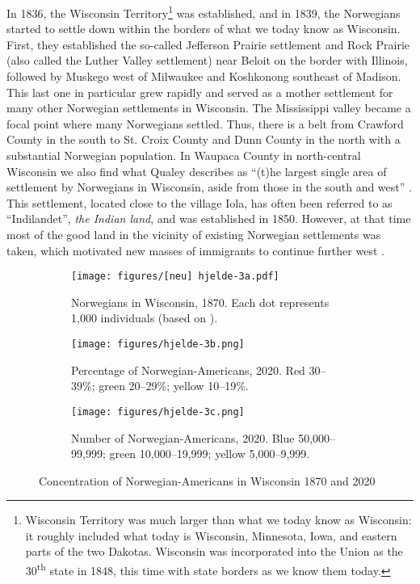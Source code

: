 \documentclass[output=paper]{langscibook}
\begin{document}
In 1836, the Wisconsin Territory\footnote{Wisconsin Territory was much larger than what we today know as Wisconsin: it roughly included what today is Wisconsin, Minnesota, Iowa, and eastern parts of the two Dakotas. Wisconsin was incorporated into the Union as the 30\textsuperscript{th} state in 1848, this time with state borders as we know them today.} was established, and in 1839, the Norwegians started to settle down within the borders of what we today know as Wisconsin. First, they established the so-called Jefferson Prairie settlement and Rock Prairie (also called the Luther Valley settlement) near Beloit on the border with Illinois, followed by Muskego west of Milwaukee and Koshkonong southeast of Madison. This last one in particular grew rapidly and served as a mother settlement for many other Norwegian settlements in Wisconsin. The Mississippi valley became a focal point where many Norwegians settled. Thus, there is a belt from Crawford County in the south to St. Croix County and Dunn County in the north with a substantial Norwegian population. In Waupaca County in north-central Wisconsin we also find what Qualey describes as “(t)he largest single area of settlement by Norwegians in Wisconsin, aside from those in the south and west” \citep[66]{Qualey1938}. This settlement, located close to the village Iola, has often been referred to as “Indilandet”, \textit{the Indian land}, and was established in 1850. However, at that time most of the good land in the vicinity of existing Norwegian settlements was taken, which motivated new masses of immigrants to continue further west \parencite[98]{Qualey1938}.
\largerpage[-1]


\begin{figure}
\begin{subfigure}[t]{.3\textwidth}
\texttt{[image: figures/[neu] hjelde-3a.pdf]} 
\caption{Norwegians in Wisconsin, 1870. Each dot represents 1,000 individuals (based on \citealt{Qualey1938}).}\label{fig:hjelde:3a}
\end{subfigure}\hfill
\begin{subfigure}[t]{.3\textwidth}
\texttt{[image: figures/hjelde-3b.png]} 
\caption{Percentage of Norwegian\hyp Americans, 2020. Red 30--39\%; green 20--29\%; yellow 10--19\%.}\label{fig:hjelde:3b}
\end{subfigure}\hfill
\begin{subfigure}[t]{.3\textwidth}
\texttt{[image: figures/hjelde-3c.png]} 
\caption{Number of Norwegian\hyp Americans, 2020. Blue 50,000--99,999; green 10,000--19,999; yellow 5,000--9,999.}\label{fig:hjelde:3c}
\end{subfigure}%
\caption{Concentration of Norwegian-Americans in Wisconsin 1870 and 2020}
\end{figure}
\end{document}
